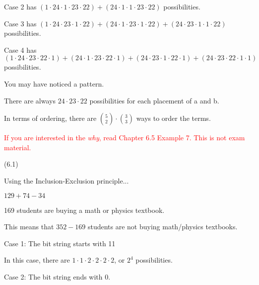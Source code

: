 \documentclass{exam}
\begin{document}
\begin{questions}
\begin{center}
Case 2 has \((1 \cdot 24 \cdot 1 \cdot 23 \cdot 22) + (24 \cdot 1 \cdot 1 \cdot 23 \cdot 22)\) possibilities.

Case 3 has \((1 \cdot 24 \cdot 23 \cdot 1 \cdot 22) + (24 \cdot 1 \cdot 23 \cdot 1 \cdot 22) + (24 \cdot 23 \cdot 1 \cdot 1 \cdot 22)\) possibilities. 

Case 4 has \((1 \cdot 24 \cdot 23 \cdot 22 \cdot 1) + (24 \cdot 1 \cdot 23 \cdot 22 \cdot 1) + (24 \cdot 23 \cdot 1 \cdot 22 \cdot 1) + (24 \cdot 23 \cdot 22 \cdot 1 \cdot 1)\) possibilities. 

You may have noticed a pattern.

There are always \(24 \cdot 23 \cdot 22\) possibilities for each placement of a and b.

In terms of ordering, there are \({5 \choose 2} \cdot {3 \choose 3}\) ways to order the terms.

\textcolor{red}{If you are interested in the \textit{why}, read Chapter 6.5 Example 7. This is not exam material.}

\end{center}

 (6.1)

\begin{center}

Using the Inclusion-Exclusion principle...

\(129 + 74 - 34\)

169 students are buying a math or physics textbook.

This means that \(352 - 169\) students are not buying math/physics textbooks.

\end{center}


\begin{center}

Case 1: The bit string starts with 11

In this case, there are \(1 \cdot 1 \cdot 2 \cdot 2 \cdot 2 \cdot 2\), or \(2^4\) possibilities.
\vspace{5px}

Case 2: The bit string ends with 0.


\end{center}
\end{questions}
\end{document}
